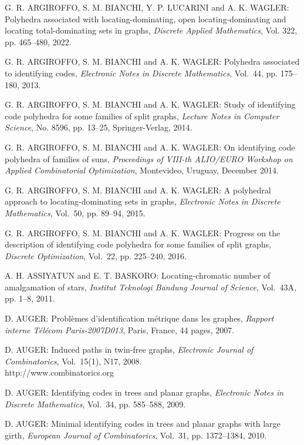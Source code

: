 \begin{thebibliography}{999}
G. R. ARGIROFFO, S. M. BIANCHI, Y. P. LUCARINI and A. K. WAGLER: Polyhedra associated with locating-dominating, open locating-dominating and locating total-dominating sets in graphs, {\it Discrete Applied Mathematics}, Vol. 322, pp. 465--480, 2022.

G. R. ARGIROFFO, S. M. BIANCHI and A. K. WAGLER: Polyhedra associated to identifying codes, {\it Electronic Notes in Discrete Mathematics}, Vol.~44, pp. 175--180, 2013.

G. R. ARGIROFFO, S. M. BIANCHI and A. K. WAGLER: Study of identifying code polyhedra for some families of split graphs, {\it Lecture Notes in Computer Science}, No. 8596, pp. 13--25, Springer-Verlag, 2014.

G. R. ARGIROFFO, S. M. BIANCHI and A. K. WAGLER: On identifying code polyhedra of families of suns, {\it Proceedings of VIII-th ALIO/EURO Workshop on Applied Combinatorial Optimization}, Montevideo, Uruguay, December 2014.

G. R. ARGIROFFO, S. M. BIANCHI and A. K. WAGLER: A polyhedral approach to locating-dominating sets in graphs, {\it Electronic Notes in Discrete Mathematics}, Vol.~50, pp. 89--94, 2015.

G. R. ARGIROFFO, S. M. BIANCHI and A. K. WAGLER: Progress on the description of identifying code polyhedra for some families of split graphs, {\it Discrete Optimization}, Vol.~22, pp. 225--240,  2016.

A. H. ASSIYATUN and E. T. BASKORO: Locating-chromatic number of amalgamation of stars, {\it Institut Teknologi Bandung Journal of Science}, Vol.~43A, pp. 1--8, 2011.

D. AUGER: Probl\`emes d'identification m\'etrique dans les graphes, {\it Rapport interne T\'el\'ecom Paris-2007D013}, Paris, France, 44 pages, 2007.

D. AUGER: Induced paths in twin-free graphs, {\it Electronic Journal of Combinatorics}, Vol.~15(1), N17, 2008.\\
http://www.combinatorics.org

D. AUGER: Identifying codes in trees and planar graphs, {\it Electronic Notes in Discrete Mathematics}, Vol.~34, pp. 585--588, 2009.

D. AUGER: Minimal identifying codes in trees and planar graphs with large girth, {\it European Journal of Combinatorics}, Vol.~31, pp. 1372--1384, 2010.


\end{thebibliography}
